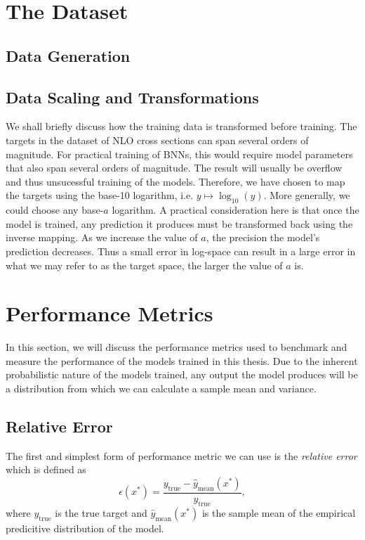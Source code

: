 \section{The Dataset}\label{sec:dataset}
\subsection{Data Generation}


\subsection{Data Scaling and Transformations}
We shall briefly discuss how the training data is transformed before training.
The targets in the dataset of NLO cross sections can span several orders of magnitude. For practical training of BNNs, this would require
model parameters that also span several orders of magnitude. The result will usually be overflow and thus unsucessful training of the models.
Therefore, we have chosen to map the targets using the base-10 logarithm, i.e. $y \mapsto \log_{10}(y)$. More generally, we could choose any base-$a$ logarithm. A practical consideration here is that once the model is trained, any prediction it produces must be transformed back using
the inverse mapping. As we increase the value of $a$, the precision the model's prediction decreases. Thus a small error in log-space 
can result in a large error in what we may refer to as the target space, the larger the value of $a$ is. 


\section{Performance Metrics}\label{seq:perf_metrics}
In this section, we will discuss the performance metrics used to benchmark and measure the performance of the models trained in this thesis.
Due to the inherent probabilistic nature of the models trained, any output the model produces will be a distribution from which we can calculate
a sample mean and variance.

\subsection{Relative Error}
The first and simplest form of performance metric we can use is the \textit{relative error} which is defined as
\begin{equation}
    \epsilon(x^*) = \frac{y_\text{true}- \hat{y}_\text{mean}(x^*)}{y_\text{true}},
\end{equation}
where $y_\text{true}$ is the true target and $\hat{y}_\text{mean}(x^*)$ is the sample mean of the empirical predicitive distribution of the model.

